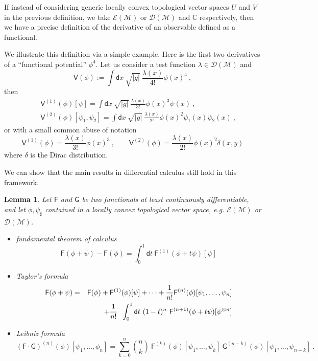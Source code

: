 \documentclass[11pt]{book}
\newcommand{\bigint}{\displaystyle\int}
\newcommand{\abs}[1]{\left|#1\right|}
\newcommand{\Dcal}{\mathcal{D}}
\newcommand{\Ecal}{\mathcal{E}}
\newcommand{\Mcal}{\mathcal{M}}
\newcommand{\Cbb}{\mathbb{C}}
\newcommand{\Fsf}{\mathsf{F}}
\newcommand{\Gsf}{\mathsf{G}}
\newcommand{\Vsf}{\mathsf{V}}
\newcommand{\dsf}{\mathsf{d}}
\theoremstyle{break}
\newtheorem{lemma}{Lemma}[chapter]
\begin{document}
If instead of considering generic locally convex topological vector spaces $U$ and $V$ in the previous definition, we take $\Ecal(\Mcal)$ or $\Dcal(\Mcal)$ and $\Cbb$ respectively, then we have a precise definition of the derivative of an observable defined as a functional.

\bigskip

We illustrate this definition via a simple example. Here is the first two derivatives of a ``functional potential'' $\phi^4$. Let us consider a test function $\lambda \in \Dcal(\Mcal)$ and 
%
\begin{equation*}
\Vsf(\phi) := \int \dsf x \ \sqrt{\abs{g}} \ \frac{\lambda(x)}{4!} \phi(x)^4 \ ,
\end{equation*}
%
then
%
\begin{eqnarray*}
&& \Vsf^{(1)}(\phi)[\psi] = \int \dsf x \ \sqrt{\abs{g}} \ \frac{\lambda(x)}{3!} \phi(x)^3  \psi(x)\ , \\
%
&& \Vsf^{(2)}(\phi)[\psi_1,\psi_2] = \int \dsf x  \ \sqrt{\abs{g}} \ \frac{\lambda(x)}{2!} \phi(x)^2 \psi_1(x)\psi_2(x) \ ,
\end{eqnarray*}
%
or with a small common abuse of notation
%
\begin{equation*}
\Vsf^{(1)}(\phi) = \frac{\lambda(x)}{3!} \phi(x)^3 \ , \qquad
%
\Vsf^{(2)}(\phi) = \frac{\lambda(x)}{2!} \phi(x)^2 \delta(x,y)  
\end{equation*}
%
where $\delta$ is the Dirac distribution. 


\bigskip


We can show that the main results in differential calculus still hold in this framework.


\begin{lemma}
%
Let $\Fsf$ and $\Gsf$ be two functionals at least continuously differentiable, and let $\phi , \psi_{\sharp}$ contained in a locally convex topological vector space, e.g. $\Ecal(\Mcal)$ or $\Dcal(\Mcal)$. 
%
\begin{itemize}
%
\item fundamental theorem of calculus
%
\begin{equation*}
\Fsf(\phi + \psi) - \Fsf(\phi) = \int_0^1 \dsf t \ \Fsf^{(1)}(\phi+t\psi)[\psi] 
\end{equation*}
%
\item Taylor's formula
\begin{eqnarray*}
\Fsf(\phi + \psi) &=& \Fsf(\phi) + \Fsf^{(1)}(\phi)[\psi] + \dots + \frac{1}{n!} \Fsf^{(n)}(\phi)[\psi_1,\dots,\psi_n] \\
&& + \cfrac{1}{n!} \ \ \bigint_0^1 \dsf t \ (1-t)^n \ \Fsf^{(n+1)}(\phi+t\psi)[\psi^{\otimes n}]
\end{eqnarray*}
%
\item Leibniz formula
\begin{equation*}
\left(\Fsf \cdot \Gsf\right)^{(n)}(\phi)[\psi_1, \dots ,\phi_n] = \sum_{k=0}^{n} \binom{n}{k} \ \Fsf^{(k)}(\phi)[\psi_1, \dots , \psi_k] \ \Gsf^{(n-k)}(\phi)[\psi_1, \dots , \psi_{n-k}] \ .
\end{equation*}
%
\end{itemize}
%
\end{lemma}
\end{document}
